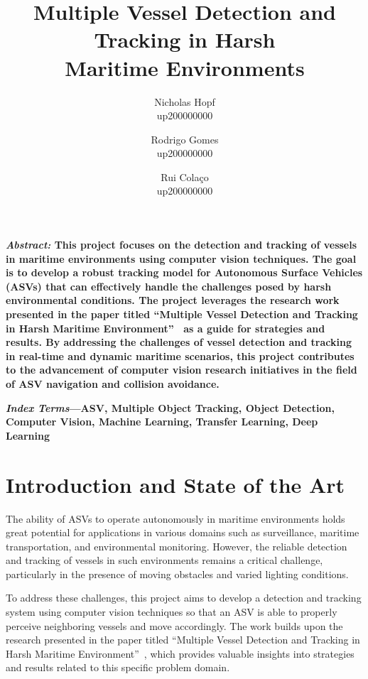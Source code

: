 \documentclass[a4paper,12pt]{article}
\title{Multiple Vessel Detection and Tracking in Harsh\\Maritime Environments}
\author{
    Nicholas Hopf\\
    up200000000
    \and
    Rodrigo Gomes\\
    up200000000
    \and
    Rui Colaço\\
    up200000000
}
\date{\vspace{-3ex}}
\begin{document}
\maketitle


\vspace{10pt}

\begin{multicols}{2}

\textbf{{\textit{Abstract:}} This project focuses on the detection and tracking of vessels in maritime environments using computer vision techniques.
    The goal is to develop a robust tracking model for Autonomous Surface Vehicles (ASVs) that can effectively handle the challenges posed by harsh environmental conditions.
    The project leverages the research work presented in the paper titled ``Multiple Vessel Detection and Tracking in Harsh Maritime Environment''~\cite{MVDTHME} as a guide for strategies and results.
    By addressing the challenges of vessel detection and tracking in real-time and dynamic maritime scenarios, this project contributes to the advancement of computer vision research initiatives in the field of ASV navigation and collision avoidance.}
\label{tab:abstract}

\textbf{{\textit{Index Terms}}—ASV, Multiple Object Tracking, Object Detection, Computer Vision, Machine Learning, Transfer Learning, Deep Learning}
\label{tab:index}



\section{Introduction and State of the Art}\label{sec:introduction-and-state-of-the-art}
The ability of ASVs to operate autonomously in maritime environments holds great potential for applications in various domains such as surveillance, maritime transportation, and environmental monitoring.
However, the reliable detection and tracking of vessels in such environments remains a critical challenge, particularly in the presence of moving obstacles and varied lighting conditions.

To address these challenges, this project aims to develop a detection and tracking system using computer vision techniques so that an ASV is able to properly perceive neighboring vessels and move accordingly.
The work builds upon the research presented in the paper titled ``Multiple Vessel Detection and Tracking in Harsh Maritime Environment''~\cite{MVDTHME}, which provides valuable insights into strategies and results related to this specific problem domain.


\end{multicols}
\end{document}
